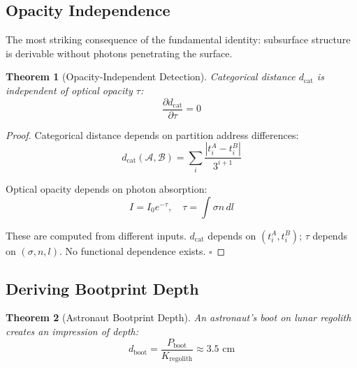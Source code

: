 \documentclass[12pt,a4paper]{article}
\newtheorem{theorem}{Theorem}[section]
\theoremstyle{definition}
\theoremstyle{remark}
\newcommand{\dcat}{d_{\mathrm{cat}}}
\begin{document}
\subsection{Opacity Independence}

The most striking consequence of the fundamental identity: subsurface structure is derivable without photons penetrating the surface.

\begin{theorem}[Opacity-Independent Detection]
\label{thm:opacity}
Categorical distance $\dcat$ is independent of optical opacity $\tau$:
\begin{equation}
\frac{\partial \dcat}{\partial \tau} = 0
\end{equation}
\end{theorem}

\begin{proof}
Categorical distance depends on partition address differences:
\begin{equation}
\dcat(\mathcal{A}, \mathcal{B}) = \sum_{i} \frac{|t_i^A - t_i^B|}{3^{i+1}}
\end{equation}

Optical opacity depends on photon absorption:
\begin{equation}
I = I_0 e^{-\tau}, \quad \tau = \int \sigma n \, dl
\end{equation}

These are computed from different inputs. $\dcat$ depends on $(t_i^A, t_i^B)$; $\tau$ depends on $(\sigma, n, l)$. No functional dependence exists. $\square$
\end{proof}

\subsection{Deriving Bootprint Depth}

\begin{theorem}[Astronaut Bootprint Depth]
\label{thm:bootprint}
An astronaut's boot on lunar regolith creates an impression of depth:
\begin{equation}
d_{\text{boot}} = \frac{P_{\text{boot}}}{K_{\text{regolith}}} \approx 3.5 \text{ cm}
\end{equation}
\end{theorem}
\end{document}
